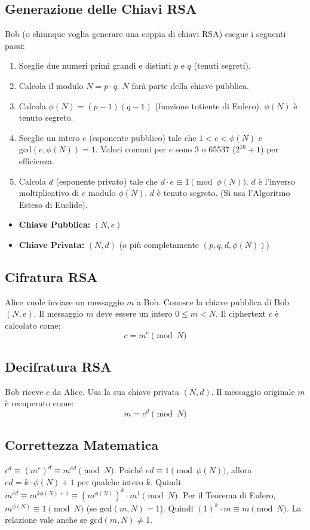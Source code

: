 \documentclass{article}
\begin{document}
\subsection{Generazione delle Chiavi RSA}
Bob (o chiunque voglia generare una coppia di chiavi RSA) esegue i seguenti passi:
\begin{enumerate}[label=\arabic*.]
    \item Sceglie due numeri primi grandi e distinti $p$ e $q$ (tenuti segreti).
    \item Calcola il modulo $N = p \cdot q$. $N$ farà parte della chiave pubblica.
    \item Calcola $\phi(N) = (p-1)(q-1)$ (funzione totiente di Eulero). $\phi(N)$ è tenuto segreto.
    \item Sceglie un intero $e$ (esponente pubblico) tale che $1 < e < \phi(N)$ e $\text{gcd}(e, \phi(N)) = 1$.
    Valori comuni per $e$ sono 3 o 65537 ($2^{16} + 1$) per efficienza.
    \item Calcola $d$ (esponente privato) tale che $d \cdot e \equiv 1 \pmod{\phi(N)}$. $d$ è l'inverso moltiplicativo di $e$ modulo $\phi(N)$. $d$ è tenuto segreto. (Si usa l'Algoritmo Esteso di Euclide).
\end{enumerate}
\begin{itemize}
    \item \textbf{Chiave Pubblica:} $(N, e)$
    \item \textbf{Chiave Privata:} $(N, d)$ (o più completamente $(p, q, d, \phi(N))$)
\end{itemize}

\subsection{Cifratura RSA}
Alice vuole inviare un messaggio $m$ a Bob. Conosce la chiave pubblica di Bob $(N, e)$. Il messaggio $m$ deve essere un intero $0 \le m < N$.
Il ciphertext $c$ è calcolato come:
$$ c = m^e \pmod{N} $$

\subsection{Decifratura RSA}
Bob riceve $c$ da Alice. Usa la sua chiave privata $(N, d)$.
Il messaggio originale $m$ è recuperato come:
$$ m = c^d \pmod{N} $$

\subsection{Correttezza Matematica}
$c^d \equiv (m^e)^d \equiv m^{ed} \pmod{N}$.
Poiché $ed \equiv 1 \pmod{\phi(N)}$, allora $ed = k \cdot \phi(N) + 1$ per qualche intero $k$.
Quindi $m^{ed} \equiv m^{k\phi(N)+1} \equiv (m^{\phi(N)})^k \cdot m^1 \pmod{N}$.
Per il Teorema di Eulero, $m^{\phi(N)} \equiv 1 \pmod{N}$ (se $\text{gcd}(m,N)=1$).
Quindi $(1)^k \cdot m \equiv m \pmod{N}$. La relazione vale anche se $\text{gcd}(m,N) \neq 1$.
\end{document}
